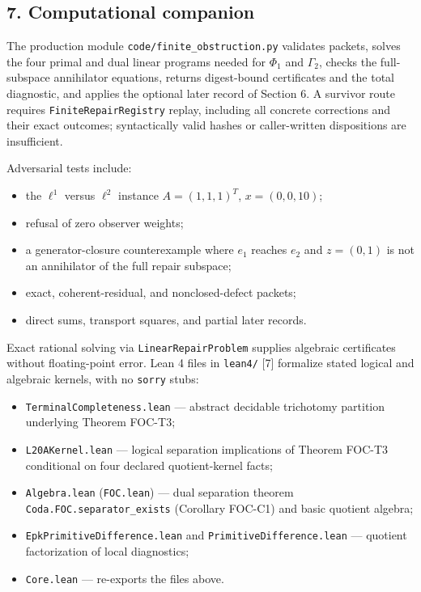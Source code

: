 \documentclass[
  11pt,
]{article}
\providecommand{\tightlist}{%
  \setlength{\itemsep}{0pt}\setlength{\parskip}{0pt}}
\begin{document}
\subsection{7. Computational companion}\label{computational-companion}

The production module \nolinkurl{code/finite_obstruction.py} validates packets, solves the four primal and dual linear programs needed for \(\Phi_1\) and \(\Gamma_2\), checks the full-subspace annihilator equations, returns digest-bound certificates and the total diagnostic, and applies the optional later record of Section 6. A survivor route requires \nolinkurl{FiniteRepairRegistry} replay, including all concrete corrections and their exact outcomes; syntactically valid hashes or caller-written dispositions are insufficient.

Adversarial tests include:

\begin{itemize}
\tightlist
\item
  the \(\ell^1\) versus \(\ell^2\) instance \(A=(1,1,1)^T\), \(x=(0,0,10)\);
\item
  refusal of zero observer weights;
\item
  a generator-closure counterexample where \(e_1\) reaches \(e_2\) and \(z=(0,1)\) is not an annihilator of the full repair subspace;
\item
  exact, coherent-residual, and nonclosed-defect packets;
\item
  direct sums, transport squares, and partial later records.
\end{itemize}

Exact rational solving via \nolinkurl{LinearRepairProblem} supplies algebraic certificates without floating-point error. Lean 4 files in \texttt{lean4/} {[}7{]} formalize stated logical and algebraic kernels, with no \texttt{sorry} stubs:

\begin{itemize}
\tightlist
\item
  \nolinkurl{TerminalCompleteness.lean} --- abstract decidable trichotomy partition underlying Theorem FOC-T3;
\item
  \nolinkurl{L20AKernel.lean} --- logical separation implications of Theorem FOC-T3 conditional on four declared quotient-kernel facts;
\item
  \nolinkurl{Algebra.lean} (\nolinkurl{FOC.lean}) --- dual separation theorem \nolinkurl{Coda.FOC.separator_exists} (Corollary FOC-C1) and basic quotient algebra;
\item
  \nolinkurl{EpkPrimitiveDifference.lean} and \nolinkurl{PrimitiveDifference.lean} --- quotient factorization of local diagnostics;
\item
  \texttt{Core.lean} --- re-exports the files above.
\end{itemize}
\end{document}

